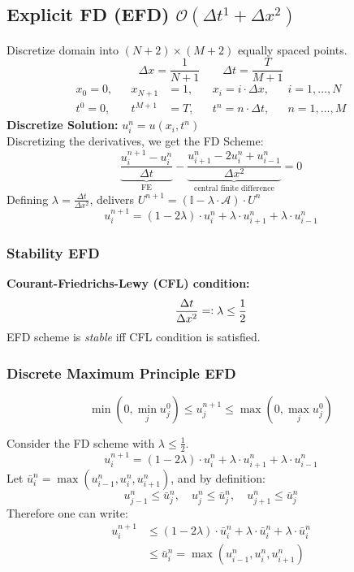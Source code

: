 \subsection{Explicit FD (EFD) \texorpdfstring{\hfill $\mathcal{O}(\Delta t^1 + \Delta x^2)$}{O(t1+x2)}}
    Discretize domain into $(N+2)\times(M+2)$ equally spaced points.
    $$
    \Delta x = \frac{1}{N+1} \qquad \Delta t = \frac{T}{M+1}
    $$
    \begin{align*}
        x_0 = 0, && x_{N+1} &= 1, && x_i = i \cdot \Delta x, && i = 1, \dots ,N\\
        t^0 = 0, && t^{M+1} &= T, && t^n = n \cdot \Delta t, && n = 1, \dots ,M
    \end{align*}
    \textbf{Discretize Solution:}\hspace{1em} $u_i^n = u(x_i,t^n)$\\[0.5em]
    Discretizing the derivatives, we get the FD Scheme:
    $$
        \underbrace{\frac{u_i^{n+1} - u_i^{n}}{\Delta t}}_{\textrm{FE}} - \underbrace{\frac{u_{i+1}^{n} -2 u_{i}^{n} + u_{i-1}^{n}}{\Delta x^2}}_{\textrm{central finite difference}} = 0
    $$
    Defining $\lambda = \frac{\Delta t}{\Delta x^2}$, delivers $U^{n+1} = (\mathbb{I} - \lambda \cdot \mathcal{A}) \cdot U^n$
    $$\boxed{
        u_{i}^{n+1} = (1- 2 \lambda) \cdot u_{i}^{n} + \lambda \cdot u_{i+1}^{n} + \lambda \cdot  u_{i-1}^{n}
    }$$
    \subsubsection{Stability EFD}
        \textbf{Courant-Friedrichs-Lewy (CFL) condition:}
        $$
            \frac{\Delta t}{\Delta x^2} =\vcentcolon \lambda \leq \frac{1}{2}
        $$
        EFD scheme is \textit{stable} iff CFL condition is satisfied.
    \subsubsection{Discrete Maximum Principle EFD}
        \vspace{-1em}
        $$\boxed{
            \min(0,\min_ju_j^0) \leq u_j^{n+1} \leq  \max(0,\max_ju_j^0)
        }$$
        \vspace{-0.5em}

        Consider the FD scheme with $\lambda \leq \frac{1}{2}$.
        $$
            u_{i}^{n+1} = (1- 2 \lambda) \cdot u_{i}^{n} + \lambda \cdot u_{i+1}^{n} + \lambda \cdot  u_{i-1}^{n}
        $$
        \vspace{2pt}
        Let $\bar{u}_i^n = \max(u_{i-1}^n,u_i^n,u_{i+1}^n)$, and by definition:
        \vspace{2pt}
        $$
            u_{j-1}^n \leq \bar{u}_j^n, \quad u_{j}^n \leq \bar{u}_j^n, \quad  u_{j+1}^n \leq \bar{u}_j^n
        $$
        Therefore one can write:
        \begin{align*}
            u_{i}^{n+1} &\leq (1- 2 \lambda) \cdot \bar{u}_{i}^{n} + \lambda \cdot \bar{u}_{i}^{n} + \lambda \cdot  \bar{u}_{i}^{n}\\
                        &\leq \bar{u}_{i}^{n} = \max(u_{i-1}^n,u_i^n,u_{i+1}^n)
        \end{align*}

